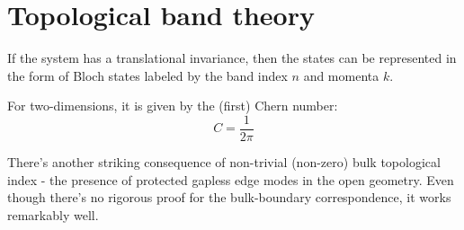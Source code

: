 \chapter{Topological band theory}
\label{ch:topo-intro}

If the system has a translational invariance, then the states can be represented in the form of Bloch states labeled by the band index $n$ and momenta $k$.


For two-dimensions, it is given by the (first) Chern number:
\begin{equation}
C = \frac{1}{2 \pi}
\end{equation}


There's another striking consequence of non-trivial (non-zero) bulk topological index - the presence of protected gapless edge modes in the open geometry. Even though there's no rigorous proof for the bulk-boundary correspondence, it works remarkably well.


